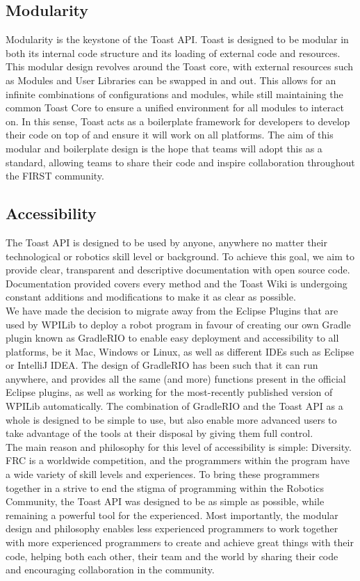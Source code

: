 \documentclass[a4paper,12pt]{article}
\begin{document}
\subsection{Modularity}
Modularity is the keystone of the Toast API. Toast is designed to be modular in both its internal code structure and its loading of external code and resources. This modular design revolves around the Toast core, with external resources such as Modules and User Libraries can be swapped in and out. This allows for an infinite combinations of configurations and modules, while still maintaining the common Toast Core to ensure a unified environment for all modules to interact on. In this sense, Toast acts as a boilerplate framework for developers to develop their code on top of and ensure it will work on all platforms. The aim of this modular and boilerplate design is the hope that teams will adopt this as a standard, allowing teams to share their code and inspire collaboration throughout the FIRST community.

\subsection{Accessibility}
The Toast API is designed to be used by anyone, anywhere no matter their technological or robotics skill level or background. To achieve this goal, we aim to provide clear, transparent and descriptive documentation with open source code. Documentation provided covers every method and the Toast Wiki is undergoing constant additions and modifications to make it as clear as possible.\\

We have made the decision to migrate away from the Eclipse Plugins that are used by WPILib to deploy a robot program in favour of creating our own Gradle plugin known as GradleRIO to enable easy deployment and accessibility to all platforms, be it Mac, Windows or Linux, as well as different IDEs such as Eclipse or IntelliJ IDEA. The design of GradleRIO has been such that it can run anywhere, and provides all the same (and more) functions present in the official Eclipse plugins, as well as working for the most-recently published version of WPILib automatically. The combination of GradleRIO and the Toast API as a whole is designed to be simple to use, but also enable more advanced users to take advantage of the tools at their disposal by giving them full control. \\

The main reason and philosophy for this level of accessibility is simple: Diversity. FRC is a worldwide competition, and the programmers within the program have a wide variety of skill levels and experiences. To bring these programmers together in a strive to end the stigma of programming within the Robotics Community, the Toast API was designed to be as simple as possible, while remaining a powerful tool for the experienced. Most importantly, the modular design and philosophy enables less experienced programmers to work together with more experienced programmers to create and achieve great things with their code, helping both each other, their team and the world by sharing their code and encouraging collaboration in the community.
\end{document}
